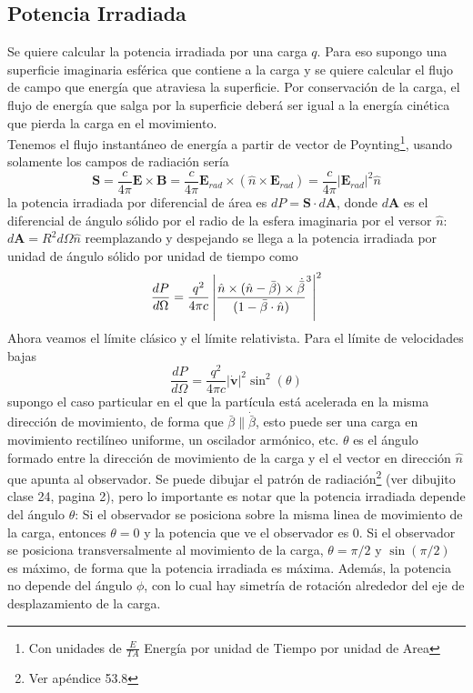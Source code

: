 \subsection{Potencia Irradiada}
Se quiere calcular la potencia irradiada por una carga $q$. Para eso supongo una superficie imaginaria esférica que contiene a la carga y se quiere calcular el flujo de campo que energía que atraviesa la superficie. Por conservación de la carga, el flujo de energía que salga por la superficie deberá ser igual a la energía cinética que pierda la carga en el movimiento.\\
\indent Tenemos el flujo instantáneo de energía a partir de vector de Poynting\footnote{Con unidades de $\frac{E}{T A}$ Energía por unidad de Tiempo por unidad de Area}, usando solamente los campos de radiación sería
\begin{equation*}
    \textbf{S} = \frac{c}{4\pi} \textbf{E}\times \textbf{B} 
    = \frac{c}{4\pi}\textbf{E}_{rad} \times (\hat{n} \times \textbf{E}_{rad})
    = \frac{c}{4\pi} |\textbf{E}_{rad}|^{2}\hat{n}
\end{equation*}
la potencia irradiada por diferencial de área es $dP = \textbf{S}\cdot d\textbf{A}$, donde $d\textbf{A}$ es el diferencial de ángulo sólido por el radio de la esfera imaginaria por el versor $\hat{n}$: $d\textbf{A} = R^{2}d\Omega \hat{n}$ reemplazando y despejando se llega a la potencia irradiada por unidad de ángulo sólido por unidad de tiempo como
\begin{equation*}
    \frac{dP}{d\Omega} = \frac{q^{2}}{4\pi c}
    \left|
        \frac%
        {%
            \hat{n}\times (\hat{n} - \bar{\beta})\times \dot{\bar{\beta}}
        }%
        {%
            (1- \bar{\beta}\cdot \hat{n})
        }^{3}
    \right|^{2}
\end{equation*}
Ahora veamos el límite clásico y el límite relativista. Para el límite de velocidades bajas 
\begin{equation}
    \frac{dP}{d\Omega} = \frac{q^{2}}{4\pi c}|\dot{\textbf{v}}|^{2}
    \sin^{2}{(\theta)}
        \label{ec:PotenciaIrradiadaPuntual}
\end{equation}
supongo el caso particular en el que la partícula está acelerada en la misma dirección de movimiento, de forma que $\bar{\beta} \parallel \dot{\bar{\beta}}$, esto puede ser una carga en movimiento rectilíneo uniforme, un oscilador armónico, etc. $\theta$ es el ángulo formado entre la dirección de movimiento de la carga y el el vector en dirección $\hat{n}$ que apunta al observador. Se puede dibujar el patrón de radiación\footnote{Ver apéndice 53.8} (ver dibujito clase 24, pagina 2), pero lo importante es notar que la potencia irradiada depende del ángulo $\theta$: Si el observador se posiciona sobre la misma linea de movimiento de la carga, entonces $\theta = 0$ y la potencia que ve el observador es $0$. Si el observador se posiciona transversalmente al movimiento de la carga, $\theta = \pi/2$ y $\sin{(\pi/2)}$ es máximo, de forma que la potencia irradiada es máxima. Además, la potencia no depende del ángulo $\phi$, con lo cual hay simetría de rotación alrededor del eje de desplazamiento de la carga.\\
